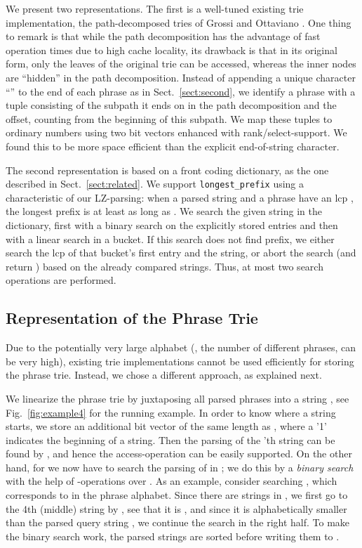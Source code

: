 \documentclass{llncs}
\begin{document}
We present two representations. The first is a well-tuned existing trie implementation, the path-decomposed tries of Grossi and Ottaviano \cite{grossi12fast}. One thing to remark is that while the path decomposition has the advantage of fast operation times due to high cache locality, its drawback is that in its original form, only the leaves of the original trie can be accessed, whereas the inner nodes are ``hidden'' in the path decomposition.
Instead of
appending a unique character ``'' to the end of each phrase as in Sect.~\ref{sect:second},
we identify a phrase with a tuple consisting of the subpath it ends on in the path decomposition and the offset, counting from the beginning of this subpath. We map these tuples to ordinary numbers using two bit vectors enhanced with rank/select-support.
We found this to be more space efficient than the explicit end-of-string character.

The second representation is based on a front coding dictionary, as the one described in Sect.~\ref{sect:related}. We support \verb|longest_prefix| using a characteristic of our LZ-parsing: when a parsed string  and a phrase  have an lcp , the longest prefix is at least as long as . We search the given string in the dictionary, first with a binary search on the explicitly stored entries and then with a linear search in a bucket. If this search does not find prefix, we either search the lcp of that bucket's first entry and the string, or abort the search (and return ) based on the already compared strings. Thus, at most two search operations are performed.

\subsection{Representation of the Phrase Trie}
\label{sect:phrase_trie}
Due to the potentially very large alphabet (, the number of different phrases, can be very high), existing trie implementations cannot be used efficiently for storing the phrase trie. Instead, we chose a different approach, as explained next.

We linearize the phrase trie by juxtaposing all parsed phrases into a string , see Fig.~\ref{fig:example4} for the running example. In order to know where a string  starts, we store an additional bit vector  of the same length as , where a '1' indicates the beginning of a string. Then the parsing of the 'th string can be found by , and hence the access-operation can be easily supported. On the other hand, for  we now have to search the parsing of  in ; we do this by a \emph{binary search} with the help of -operations over . As an example, consider searching , which corresponds to  in the phrase alphabet. Since there are  strings in , we first go to the 4th (middle) string by , see that it is , and since it is alphabetically smaller than the parsed query string , we continue the search in the right half. To make the binary search work, the parsed strings are sorted before writing them to .
\end{document}
